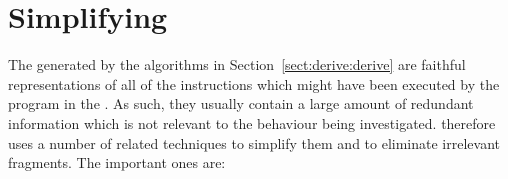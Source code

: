 \chapter{Simplifying {\StateMachines}}

The {\StateMachines} generated by the algorithms in
Section~\ref{sect:derive:derive} are faithful representations of all
of the instructions which might have been executed by the program in
the .  As such, they usually contain a large
amount of redundant information which is not relevant to the behaviour
being investigated.  {\Technique} therefore uses a number of related
techniques to simplify them and to eliminate irrelevant fragments.
The important ones are:

